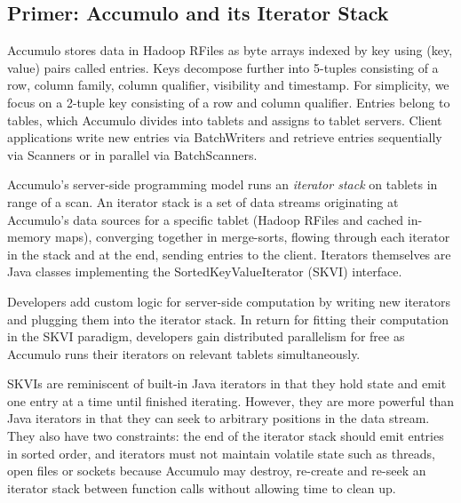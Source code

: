 





\subsection{Primer: Accumulo and its Iterator Stack}
\label{sAccumuloIterators}
Accumulo stores data in Hadoop RFiles as byte arrays indexed by key using (key, value) pairs called entries.
Keys decompose further into 5-tuples consisting of a row, column family, column qualifier, visibility and timestamp.
For simplicity, we focus on a 2-tuple key consisting of a row and column qualifier.
Entries belong to tables, which Accumulo divides into tablets and assigns to tablet servers.
Client applications write new entries via BatchWriters 
and retrieve entries sequentially via Scanners
or in parallel via BatchScanners.

Accumulo's server-side programming model runs an \emph{iterator stack} on tablets in range of a scan.
An iterator stack is a set of data streams originating
at Accumulo's data sources for a specific tablet (Hadoop RFiles and cached in-memory maps), 
converging together in merge-sorts,
flowing through each iterator in the stack and at the end, sending entries to the client.
Iterators themselves are Java classes implementing the SortedKeyValueIterator (SKVI) interface.

Developers add custom logic for server-side computation
by writing new iterators and plugging them into the iterator stack.
In return for fitting their computation in the SKVI paradigm, developers gain
distributed parallelism for free as Accumulo runs their iterators on relevant tablets simultaneously.


SKVIs are reminiscent of built-in Java iterators in that they hold state 
and emit one entry at a time until finished iterating.
However, they are more powerful than Java iterators in that they can seek to arbitrary positions
in the data stream. %
They also have two constraints: 
the end of the iterator stack should emit entries in sorted order,
and iterators must not maintain volatile state such as threads, open files or sockets
because Accumulo may destroy, re-create and re-seek an iterator stack
between function calls without allowing time to clean up.

